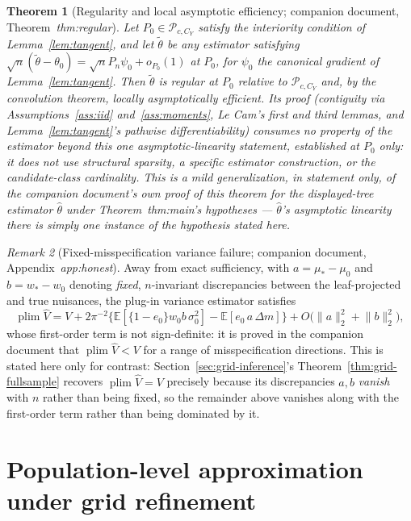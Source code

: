 \documentclass[11pt]{article}
\theoremstyle{plain}
\newtheorem{theorem}{Theorem}[section]
\theoremstyle{definition}
\theoremstyle{remark}
\newtheorem{remark}[theorem]{Remark}
\newcommand{\E}{\mathbb{E}}
\newcommand{\cP}{\mathcal{P}}
\newcommand{\ez}{e_0}
\newcommand{\mz}{\mu_0}
\newcommand{\wz}{w_0}
\newcommand{\Vhat}{\widehat{V}}
\newcommand{\Ltwo}[1]{\lVert #1 \rVert_{2}}
\DeclareMathOperator{\plim}{plim}
\begin{document}
\begin{theorem}[Regularity and local asymptotic efficiency; companion
document, Theorem~\emph{thm:regular}]\label{thm:regular}
Let $P_0\in\cP_{c,C_Y}$ satisfy the interiority condition of
Lemma~\ref{lem:tangent}, and let $\widetilde\theta$ be \emph{any} estimator
satisfying $\sqrt n(\widetilde\theta-\theta_0)=\sqrt nP_n\psi_0+o_{P_0}(1)$
at $P_0$, for $\psi_0$ the canonical gradient of Lemma~\ref{lem:tangent}.
Then $\widetilde\theta$ is regular at $P_0$ relative to $\cP_{c,C_Y}$ and,
by the convolution theorem, locally asymptotically efficient. Its proof
(contiguity via Assumptions~\ref{ass:iid} and~\ref{ass:moments}, Le Cam's
first and third lemmas, and Lemma~\ref{lem:tangent}'s pathwise
differentiability) consumes no property of the estimator beyond this one
asymptotic-linearity statement, established at $P_0$ only: it does not use
structural sparsity, a specific estimator construction, or the
candidate-class cardinality. This is a mild generalization, in statement
only, of the companion document's own proof of this theorem for the
displayed-tree estimator $\widehat\theta$ under Theorem~\emph{thm:main}'s
hypotheses --- $\widehat\theta$'s asymptotic linearity there is simply one
instance of the hypothesis stated here.
\end{theorem}

\begin{remark}[Fixed-misspecification variance failure; companion document,
Appendix~\emph{app:honest}]\label{rem:honest}
Away from exact sufficiency, with $a=\mu_*-\mz$ and $b=w_*-\wz$ denoting
\emph{fixed}, $n$-invariant discrepancies between the leaf-projected and
true nuisances, the plug-in variance estimator satisfies
\[
  \plim\Vhat
  =V+2\pi^{-2}\bigl\{\E[\{1-\ez\}\wz b\,\sigma_0^2]
   -\E[\ez\,a\,\Delta m]\bigr\}+O\bigl(\Ltwo a^2+\Ltwo b^2\bigr),
\]
whose first-order term is not sign-definite: it is proved in the companion
document that $\plim\Vhat<V$ for a range of misspecification directions.
This is stated here only for contrast: Section~\ref{sec:grid-inference}'s
Theorem~\ref{thm:grid-fullsample} recovers $\plim\Vhat=V$ precisely because
its discrepancies $a,b$ \emph{vanish} with $n$ rather than being fixed, so
the remainder above vanishes along with the first-order term rather than
being dominated by it.
\end{remark}

\section{Population-level approximation under grid refinement}\label{sec:mesh}
\end{document}
